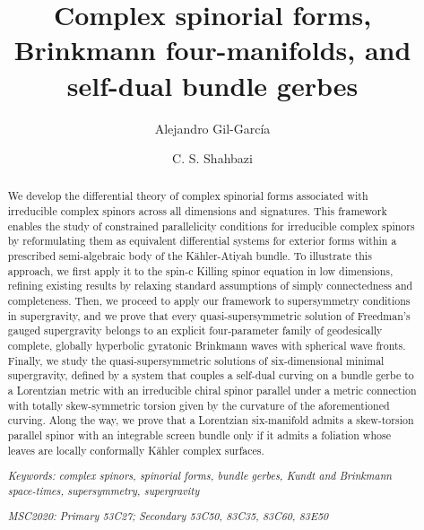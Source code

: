 \documentclass[10pt,a4paper,twoside,reqno]{amsart}
\theoremstyle{plain}
\theoremstyle{definition}
\theoremstyle{remark}
\begin{document}
\title[Complex spinorial forms, Brinkmann four-manifolds, and self-dual bundle gerbes]{Complex spinorial forms, Brinkmann four-manifolds, and self-dual bundle gerbes}

\author[Alejandro Gil-García]{Alejandro Gil-García }
\address{Scuola Internazionale Superiore di Studi Avanzati, Trieste, Italy}

\author[C. S. Shahbazi]{C. S. Shahbazi }
\address{Departamento de Matem\'aticas, Universidad UNED - Madrid, Reino de Espa\~na}

\begin{abstract}
We develop the differential theory of complex spinorial forms associated with irreducible complex spinors across all dimensions and signatures. This framework enables the study of constrained parallelicity conditions for irreducible complex spinors by reformulating them as equivalent differential systems for exterior forms within a prescribed semi-algebraic body of the Kähler-Atiyah bundle. To illustrate this approach, we first apply it to the spin-c Killing spinor equation in low dimensions, refining existing results by relaxing standard assumptions of simply connectedness and completeness. Then, we proceed to apply our framework to supersymmetry conditions in supergravity, and we prove that every quasi-supersymmetric solution of Freedman’s gauged supergravity belongs to an explicit four-parameter family of geodesically complete, globally hyperbolic gyratonic Brinkmann waves with spherical wave fronts. Finally, we study the quasi-supersymmetric solutions of six-dimensional minimal supergravity, defined by a system that couples a self-dual curving on a bundle gerbe to a Lorentzian metric with an irreducible chiral spinor parallel under a metric connection with totally skew-symmetric torsion given by the curvature of the aforementioned curving. Along the way, we prove that a Lorentzian six-manifold admits a skew-torsion parallel spinor with an integrable screen bundle only if it admits a foliation whose leaves are locally conformally Kähler complex surfaces.\bigskip

\noindent
\emph{Keywords: complex spinors, spinorial forms, bundle gerbes, Kundt and Brinkmann space-times, supersymmetry, supergravity}\medskip

\noindent
\emph{MSC2020: Primary 53C27; Secondary 53C50, 83C35, 83C60, 83E50}

\end{abstract}
 
\end{document}
